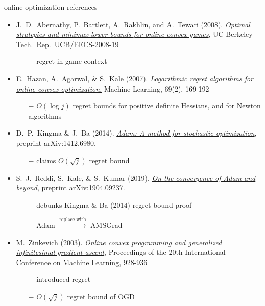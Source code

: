 \documentclass[xcolor={svgnames},
               hyperref={colorlinks,citecolor=DeepPink4,linkcolor=FireBrick,urlcolor=Maroon},
               usepdftitle=false]  %
               {beamer}
\begin{document}
\begin{frame}{online optimization references}

\begin{itemize}
\footnotesize
\item J.~D.~Abernathy, P.~Bartlett, A.~Rakhlin, and A.~Tewari (2008). \href{https://www2.eecs.berkeley.edu/Pubs/TechRpts/2008/EECS-2008-19.pdf}{\emph{Optimal strategies and minimax lower bounds for online convex games}}, UC Berkeley Tech.~Rep.~UCB/EECS-2008-19
    \begin{itemize}
    \scriptsize
    \item[$-$] regret in game context
    \end{itemize}
\item E.~Hazan, A.~Agarwal, \& S.~Kale (2007).  \href{https://link.springer.com/content/pdf/10.1007/s10994-007-5016-8.pdf}{\emph{Logarithmic regret algorithms for online convex optimization.}} Machine Learning, 69(2), 169-192
    \begin{itemize}
    \scriptsize
    \item[$-$] $O(\log j)$ regret bounds for positive definite Hessians, and for Newton algorithms
    \end{itemize}
\item D.~P.~Kingma \& J.~Ba (2014). \href{https://arxiv.org/abs/1412.6980}{\emph{Adam: A method for stochastic optimization}}, preprint arXiv:1412.6980.
    \begin{itemize}
    \scriptsize
    \item[$-$] claims $O(\sqrt{j})$ regret bound
    \end{itemize}
\item S.~J.~Reddi, S.~Kale, \& S.~Kumar (2019). \href{https://arxiv.org/abs/1904.09237}{\emph{On the convergence of Adam and beyond}}, preprint arXiv:1904.09237.
    \begin{itemize}
    \scriptsize
    \item[$-$] debunks Kingma \& Ba (2014) regret bound proof
    \item[$-$] Adam $\stackrel{\text{replace with}}{\to}$ AMSGrad
    \end{itemize}
\item M.~Zinkevich (2003). \href{https://www.aaai.org/Papers/ICML/2003/ICML03-120.pdf}{\emph{Online convex programming and generalized infinitesimal gradient ascent}}, Proceedings of the 20th International Conference on Machine Learning, 928-936
    \begin{itemize}
    \scriptsize
    \item[$-$] introduced regret
    \item[$-$] $O(\sqrt{j})$ regret bound of OGD
    \end{itemize}
\end{itemize}
\end{frame}
\end{document}
